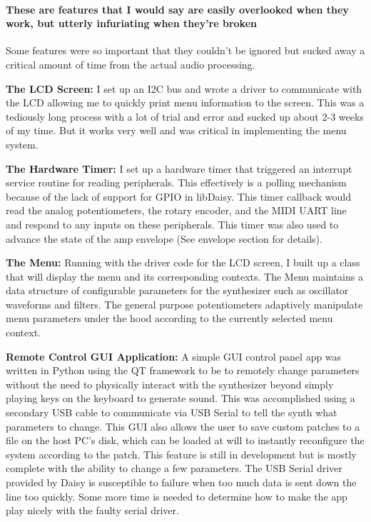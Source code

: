 \documentclass[acmlarge,screen]{acmart}
\begin{document}
	\paragraph{These are features that I would say are easily overlooked when they work, but utterly infuriating when they're broken} Some features were so important that they couldn't be ignored but sucked away a critical amount of time from the actual audio processing.

	\textbf{The LCD Screen:} I set up an I2C bus and wrote a driver to communicate with the LCD allowing me to quickly print menu information to the screen. This was a tediously long process with a lot of trial and error and sucked up about 2-3 weeks of my time. But it works very well and was critical in implementing the menu system.

	\textbf{The Hardware Timer:} I set up a hardware timer that triggered an interrupt service routine for reading peripherals. This effectively is a polling mechanism because of the lack of support for GPIO  in libDaisy. This timer callback would read the analog potentiometers, the rotary encoder, and the MIDI UART line and respond to any inputs on these peripherals. This timer was also used to advance the state of the amp envelope (See envelope section for details).
	
	\textbf{The Menu:} Running with the driver code for the LCD screen, I built up a class that will display the menu and its corresponding contexts. The Menu maintains a data structure of configurable parameters for the synthesizer such as oscillator waveforms and filters. The general purpose potentiometers adaptively manipulate menu parameters under the hood according to the currently selected menu context.
	
	\textbf{Remote Control GUI Application:} A simple GUI control panel app was written in Python using the QT framework to be to remotely change parameters without the need to physically interact with the synthesizer beyond simply playing keys on the keyboard to generate sound. This was accomplished using a secondary USB cable to communicate via USB Serial to tell the synth what parameters to change. This GUI also allows the user to save custom patches to a file on the host PC's disk, which can be loaded at will to instantly reconfigure the system according to the patch. This feature is still in development but is mostly complete with the ability to change a few parameters. The USB Serial driver provided by Daisy is susceptible to failure when too much data is sent down the line too quickly. Some more time is needed to determine how to make the app play nicely with the faulty serial driver.
\end{document}
